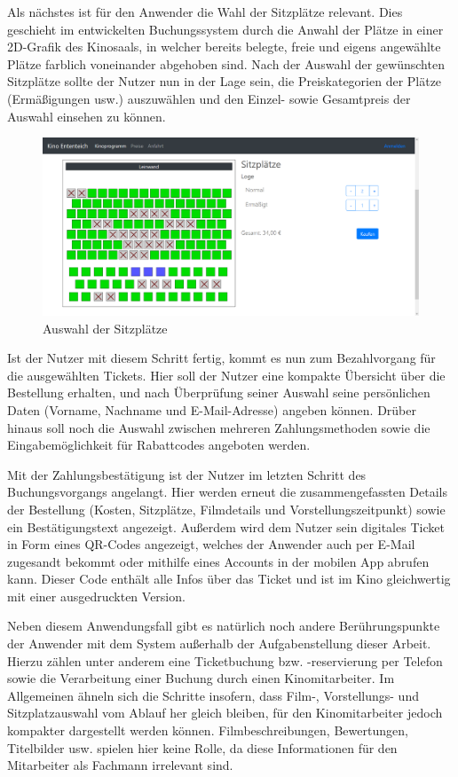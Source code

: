 Als nächstes ist für den Anwender die Wahl der Sitzplätze relevant.
Dies geschieht im entwickelten Buchungssystem durch die Anwahl der Plätze in einer 2D-Grafik des Kinosaals, in welcher bereits belegte, freie und eigens angewählte Plätze farblich voneinander abgehoben sind.
Nach der Auswahl der gewünschten Sitzplätze sollte der Nutzer nun in der Lage sein, die Preiskategorien der Plätze (Ermäßigungen usw.) auszuwählen und den Einzel- sowie Gesamtpreis der Auswahl einsehen zu können.

\begin{figure}[ht]
	\centering
	\includegraphics[width=\textwidth]{img/screenshots/vorstellung02}
	\captionsetup{format=hang}
	\caption{Auswahl der Sitzplätze}
	\label{fig:vorstellung02-2}
\end{figure}

Ist der Nutzer mit diesem Schritt fertig, kommt es nun zum Bezahlvorgang für die ausgewählten Tickets.
Hier soll der Nutzer eine kompakte Übersicht über die Bestellung erhalten, und nach Überprüfung seiner Auswahl seine persönlichen Daten (Vorname, Nachname und E-Mail-Adresse) angeben können.
Drüber hinaus soll noch die Auswahl zwischen mehreren Zahlungsmethoden sowie die Eingabemöglichkeit für Rabattcodes angeboten werden.

Mit der Zahlungsbestätigung ist der Nutzer im letzten Schritt des Buchungsvorgangs angelangt.
Hier werden erneut die zusammengefassten Details der Bestellung (Kosten, Sitzplätze, Filmdetails und Vorstellungszeitpunkt) sowie ein Bestätigungstext angezeigt.
Außerdem wird dem Nutzer sein digitales Ticket in Form eines \acs{QR-Code}s angezeigt, welches der Anwender auch per E-Mail zugesandt bekommt oder mithilfe eines Accounts in der mobilen App abrufen kann.
Dieser Code enthält alle Infos über das Ticket und ist im Kino gleichwertig mit einer ausgedruckten Version.

Neben diesem Anwendungsfall gibt es natürlich noch andere Berührungspunkte der Anwender mit dem System außerhalb der Aufgabenstellung dieser Arbeit.
Hierzu zählen unter anderem eine Ticketbuchung bzw. -reservierung per Telefon sowie die Verarbeitung einer Buchung durch einen Kinomitarbeiter.
Im Allgemeinen ähneln sich die Schritte insofern, dass Film-, Vorstellungs- und Sitzplatzauswahl vom Ablauf her gleich bleiben, für den Kinomitarbeiter jedoch kompakter dargestellt werden können.
Filmbeschreibungen, Bewertungen, Titelbilder usw. spielen hier keine Rolle, da diese Informationen für den Mitarbeiter als Fachmann irrelevant sind.